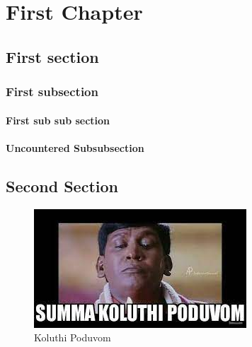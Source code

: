 \chapter{First Chapter}\label{ch:chapter-name}
\section{First section}\label{sec:sec1-name}
\lipsum[1]
\subsection{First subsection}\label{sec:sub-sec-name}
\lipsum[2]
\subsubsection{First sub sub section}\label{sec:sub-sub-sec-name}
\lipsum[3]
\subsubsection*{Uncountered Subsubsection}\label{}
\lipsum[4]
\section{Second Section}
\lipsum[5]\cite{Article1}
\begin{figure}[!ht]
    \centering
    \includegraphics[scale = 1]{assets/fire.jpg}
    \caption{ Koluthi Poduvom}
\end{figure}